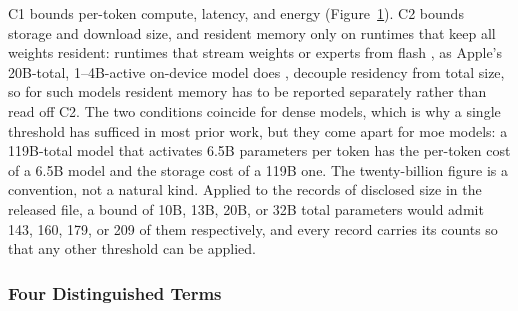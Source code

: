 \begin{figure}[t]
\label{fig:slm_definition}
\end{figure}

C1 bounds per-token compute, latency, and energy (Figure~\ref{fig:slm_definition}). C2 bounds storage and download size, and resident memory only on runtimes that keep all weights resident: runtimes that stream weights or experts from flash \citep{alizadeh2024llmflash}, as Apple's 20B-total, 1--4B-active on-device model does \citep{apple2026afm3}, decouple residency from total size, so for such models resident memory has to be reported separately rather than read off C2. The two conditions coincide for dense models, which is why a single threshold has sufficed in most prior work, but they come apart for \gls{moe} models: a 119B-total model that activates 6.5B parameters per token has the per-token cost of a 6.5B model and the storage cost of a 119B one. The twenty-billion figure is a convention, not a natural kind. Applied to the records of disclosed size in the released file, a bound of 10B, 13B, 20B, or 32B total parameters would admit 143, 160, 179, or 209 of them respectively, and every record carries its counts so that any other threshold can be applied.

\subsubsection{Four Distinguished Terms}
\label{subsubsec:intro_def_terms}

